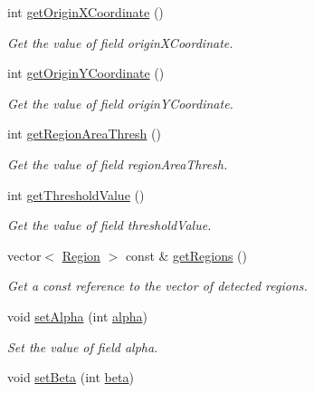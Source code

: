 \begin{DoxyCompactItemize}
int \hyperlink{classmultiscale_1_1analysis_1_1RegionDetector_aea7192e8394c264e623be52c44f6a986}{get\-Origin\-X\-Coordinate} ()
\begin{DoxyCompactList}\small\item\em \-Get the value of field origin\-X\-Coordinate. \end{DoxyCompactList}\item 
int \hyperlink{classmultiscale_1_1analysis_1_1RegionDetector_a332fc0877bbad43858acd175833ce4d6}{get\-Origin\-Y\-Coordinate} ()
\begin{DoxyCompactList}\small\item\em \-Get the value of field origin\-Y\-Coordinate. \end{DoxyCompactList}\item 
int \hyperlink{classmultiscale_1_1analysis_1_1RegionDetector_a376ab8398852d02f3f4f2f5ffa4ec34b}{get\-Region\-Area\-Thresh} ()
\begin{DoxyCompactList}\small\item\em \-Get the value of field region\-Area\-Thresh. \end{DoxyCompactList}\item 
int \hyperlink{classmultiscale_1_1analysis_1_1RegionDetector_aa429084aca1e04ec288878822e33bf36}{get\-Threshold\-Value} ()
\begin{DoxyCompactList}\small\item\em \-Get the value of field threshold\-Value. \end{DoxyCompactList}\item 
vector$<$ \hyperlink{classmultiscale_1_1analysis_1_1Region}{\-Region} $>$ const \& \hyperlink{classmultiscale_1_1analysis_1_1RegionDetector_ab24abc7d629de96a342fe4f056f7d48c}{get\-Regions} ()
\begin{DoxyCompactList}\small\item\em \-Get a const reference to the vector of detected regions. \end{DoxyCompactList}\item 
void \hyperlink{classmultiscale_1_1analysis_1_1RegionDetector_ada64f919fd5310987b950c052a3cf93a}{set\-Alpha} (int \hyperlink{classmultiscale_1_1analysis_1_1RegionDetector_ab768a3bbfff9835b441a889ab2cb05a6}{alpha})
\begin{DoxyCompactList}\small\item\em \-Set the value of field alpha. \end{DoxyCompactList}\item 
void \hyperlink{classmultiscale_1_1analysis_1_1RegionDetector_a054b6327918fd9a6ff2de293dac1afc0}{set\-Beta} (int \hyperlink{classmultiscale_1_1analysis_1_1RegionDetector_a23c831170c2264dd7e59067a1a7d3c8e}{beta})

\end{DoxyCompactItemize}
